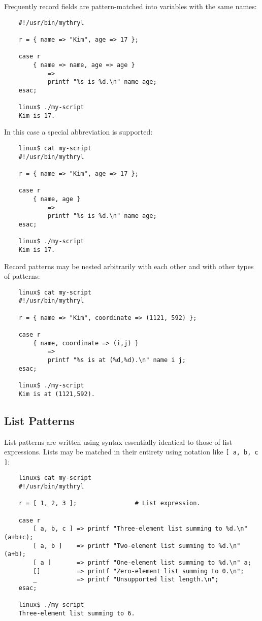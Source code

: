 Frequently record fields are pattern-matched into variables 
with the same names:

\begin{verbatim}
    #!/usr/bin/mythryl

    r = { name => "Kim", age => 17 };

    case r
        { name => name, age => age }
            =>
            printf "%s is %d.\n" name age;
    esac;

    linux$ ./my-script
    Kim is 17.
\end{verbatim}

In this case a special abbreviation is supported:

\begin{verbatim}
    linux$ cat my-script
    #!/usr/bin/mythryl

    r = { name => "Kim", age => 17 };

    case r
        { name, age }
            =>
            printf "%s is %d.\n" name age;
    esac;

    linux$ ./my-script
    Kim is 17.
\end{verbatim}

Record patterns may be nested arbitrarily with each 
other and with other types of patterns:

\begin{verbatim}
    linux$ cat my-script
    #!/usr/bin/mythryl

    r = { name => "Kim", coordinate => (1121, 592) };

    case r
        { name, coordinate => (i,j) }
            =>
            printf "%s is at (%d,%d).\n" name i j;
    esac;

    linux$ ./my-script
    Kim is at (1121,592).
\end{verbatim}

\cutend*

\subsection{List Patterns}
\label{section:ref:case-expressions-and-pattern-matching:list-patterns}

List patterns are written using syntax 
essentially identical to those of list expressions.  Lists 
may be matched in their entirety using notation 
like {\tt [ a, b, c ]}:

\begin{verbatim}
    linux$ cat my-script
    #!/usr/bin/mythryl

    r = [ 1, 2, 3 ];				# List expression.

    case r
        [ a, b, c ] => printf "Three-element list summing to %d.\n" (a+b+c);
        [ a, b ]    => printf "Two-element list summing to %d.\n" (a+b);
        [ a ]       => printf "One-element list summing to %d.\n" a;
        []          => printf "Zero-element list summing to 0.\n";
        _           => printf "Unsupported list length.\n";
    esac;

    linux$ ./my-script
    Three-element list summing to 6.
\end{verbatim}

